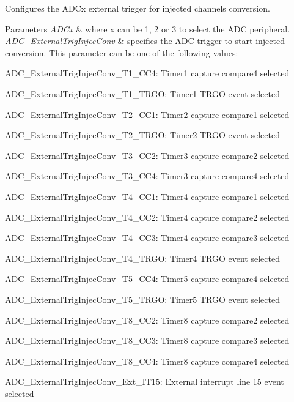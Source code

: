 Configures the A\+D\+Cx external trigger for injected channels conversion. 


\begin{DoxyParams}{Parameters}
{\em A\+D\+Cx} & where x can be 1, 2 or 3 to select the A\+DC peripheral. \\
\hline
{\em A\+D\+C\+\_\+\+External\+Trig\+Injec\+Conv} & specifies the A\+DC trigger to start injected conversion. This parameter can be one of the following values\+: \begin{DoxyItemize}
\item A\+D\+C\+\_\+\+External\+Trig\+Injec\+Conv\+\_\+\+T1\+\_\+\+C\+C4\+: Timer1 capture compare4 selected \item A\+D\+C\+\_\+\+External\+Trig\+Injec\+Conv\+\_\+\+T1\+\_\+\+T\+R\+GO\+: Timer1 T\+R\+GO event selected \item A\+D\+C\+\_\+\+External\+Trig\+Injec\+Conv\+\_\+\+T2\+\_\+\+C\+C1\+: Timer2 capture compare1 selected \item A\+D\+C\+\_\+\+External\+Trig\+Injec\+Conv\+\_\+\+T2\+\_\+\+T\+R\+GO\+: Timer2 T\+R\+GO event selected \item A\+D\+C\+\_\+\+External\+Trig\+Injec\+Conv\+\_\+\+T3\+\_\+\+C\+C2\+: Timer3 capture compare2 selected \item A\+D\+C\+\_\+\+External\+Trig\+Injec\+Conv\+\_\+\+T3\+\_\+\+C\+C4\+: Timer3 capture compare4 selected \item A\+D\+C\+\_\+\+External\+Trig\+Injec\+Conv\+\_\+\+T4\+\_\+\+C\+C1\+: Timer4 capture compare1 selected \item A\+D\+C\+\_\+\+External\+Trig\+Injec\+Conv\+\_\+\+T4\+\_\+\+C\+C2\+: Timer4 capture compare2 selected \item A\+D\+C\+\_\+\+External\+Trig\+Injec\+Conv\+\_\+\+T4\+\_\+\+C\+C3\+: Timer4 capture compare3 selected \item A\+D\+C\+\_\+\+External\+Trig\+Injec\+Conv\+\_\+\+T4\+\_\+\+T\+R\+GO\+: Timer4 T\+R\+GO event selected \item A\+D\+C\+\_\+\+External\+Trig\+Injec\+Conv\+\_\+\+T5\+\_\+\+C\+C4\+: Timer5 capture compare4 selected \item A\+D\+C\+\_\+\+External\+Trig\+Injec\+Conv\+\_\+\+T5\+\_\+\+T\+R\+GO\+: Timer5 T\+R\+GO event selected \item A\+D\+C\+\_\+\+External\+Trig\+Injec\+Conv\+\_\+\+T8\+\_\+\+C\+C2\+: Timer8 capture compare2 selected \item A\+D\+C\+\_\+\+External\+Trig\+Injec\+Conv\+\_\+\+T8\+\_\+\+C\+C3\+: Timer8 capture compare3 selected \item A\+D\+C\+\_\+\+External\+Trig\+Injec\+Conv\+\_\+\+T8\+\_\+\+C\+C4\+: Timer8 capture compare4 selected \item A\+D\+C\+\_\+\+External\+Trig\+Injec\+Conv\+\_\+\+Ext\+\_\+\+I\+T15\+: External interrupt line 15 event selected \end{DoxyItemize}
\\
\hline
\end{DoxyParams}

